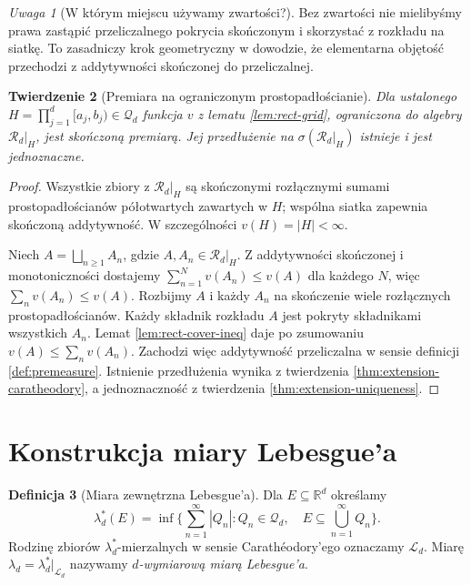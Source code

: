 \documentclass[11pt,a4paper,oneside]{book}
\numberwithin{equation}{chapter}
\theoremstyle{plain}
\newtheorem{twierdzenie}{Twierdzenie}[chapter]
\theoremstyle{definition}
\newtheorem{definicja}[twierdzenie]{Definicja}
\theoremstyle{remark}
\newtheorem{uwaga}[twierdzenie]{Uwaga}
\begin{document}
\begin{uwaga}[W którym miejscu używamy zwartości?]
Bez zwartości nie mielibyśmy prawa zastąpić
przeliczalnego pokrycia skończonym i skorzystać
z rozkładu na siatkę. To zasadniczy krok geometryczny
w dowodzie, że elementarna objętość przechodzi
z addytywności skończonej do przeliczalnej.
\end{uwaga}

\begin{twierdzenie}[Premiara na ograniczonym prostopadłościanie]
\label{thm:volume-premeasure}
Dla ustalonego $H=\prod_{j=1}^d[a_j,b_j)\in\mathcal Q_d$
funkcja $v$ z lematu \ref{lem:rect-grid}, ograniczona do
algebry $\mathcal R_d|_H$, jest skończoną premiarą.
Jej przedłużenie na $\sigma(\mathcal R_d|_H)$ istnieje
i jest jednoznaczne.
\end{twierdzenie}

\begin{proof}
Wszystkie zbiory z $\mathcal R_d|_H$ są skończonymi
rozłącznymi sumami prostopadłościanów półotwartych
zawartych w $H$; wspólna siatka zapewnia skończoną
addytywność. W szczególności $v(H)=|H|<\infty$.

Niech $A=\bigsqcup_{n\ge1}A_n$, gdzie
$A,A_n\in\mathcal R_d|_H$. Z addytywności skończonej
i monotoniczności dostajemy
$\sum_{n=1}^Nv(A_n)\le v(A)$ dla każdego $N$, więc
$\sum_nv(A_n)\le v(A)$.
Rozbijmy $A$ i każdy $A_n$ na skończenie wiele
rozłącznych prostopadłościanów. Każdy składnik rozkładu
$A$ jest pokryty składnikami wszystkich $A_n$.
Lemat \ref{lem:rect-cover-ineq} daje po zsumowaniu
$v(A)\le\sum_nv(A_n)$. Zachodzi więc addytywność
przeliczalna w sensie definicji \ref{def:premeasure}.
Istnienie przedłużenia wynika z twierdzenia
\ref{thm:extension-caratheodory}, a jednoznaczność
z twierdzenia \ref{thm:extension-uniqueness}.
\end{proof}

\section{Konstrukcja miary Lebesgue'a}

\begin{definicja}[Miara zewnętrzna Lebesgue'a]
\label{def:lebesgue-outer}
Dla $E\subseteq\mathbb R^d$ określamy
\begin{equation}\label{eq:lebesgue-outer}
\lambda_d^*(E)=\inf\Big\{\sum_{n=1}^\infty|Q_n|:
Q_n\in\mathcal Q_d,\quad E\subseteq\bigcup_{n=1}^\infty Q_n\Big\}.
\end{equation}
Rodzinę zbiorów $\lambda_d^*$-mierzalnych w sensie
Carathéodory'ego oznaczamy $\mathcal L_d$.
Miarę $\lambda_d=\lambda_d^*|_{\mathcal L_d}$
nazywamy \emph{$d$-wymiarową miarą Lebesgue'a}.
\end{definicja}
\end{document}
